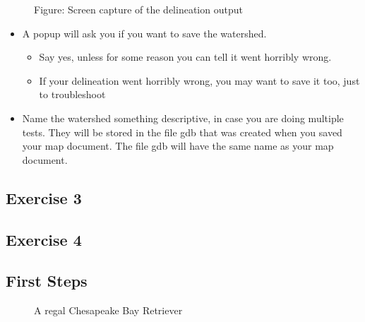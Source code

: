 \documentclass[letterpaper,10pt,english]{sphinxmanual}
\let\sphinxpxdimen\pdfpxdimen\else\newdimen\sphinxpxdimen
\begin{document}
\begin{figure}[htbp]
\centering
\capstart

\noindent{}
\caption{Figure: Screen capture of the delineation output}\label{\detokenize{ex_2:id46}}\end{figure}
\begin{itemize}
\item {} 
A popup will ask you if you want to save the watershed.
\begin{itemize}
\item {} 
Say yes, unless for some reason you can tell it went horribly wrong.

\item {} 
If your delineation went horribly wrong, you may want to save it too, just to troubleshoot

\end{itemize}

\item {} 
Name the watershed something descriptive, in case you are doing multiple tests. They will be stored in the file gdb that was created when you saved your map document. The file gdb will have the same name as your map document.

\end{itemize}



\subsection{Exercise 3}
\label{\detokenize{ex_3:exercise-3}}\label{\detokenize{ex_3::doc}}

\subsection{Exercise 4}
\label{\detokenize{ex_4:exercise-4}}\label{\detokenize{ex_4::doc}}

\subsection{First Steps}
\label{\detokenize{firstSteps:first-steps}}\label{\detokenize{firstSteps::doc}}
\noindent{}

\begin{figure}[htbp]
\centering
\capstart

\noindent\sphinxincludegraphics[height=300\sphinxpxdimen]{{osabear}.JPG}
\caption{ A regal Chesapeake Bay Retriever}\label{\detokenize{firstSteps:id1}}\end{figure}
\end{document}

